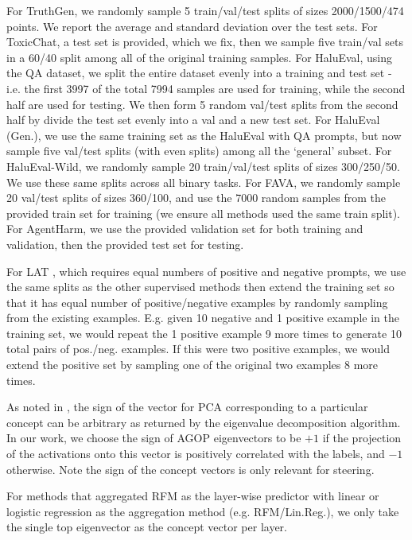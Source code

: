 For TruthGen, we randomly sample 5 train/val/test splits of sizes 2000/1500/474 points. We report the average and standard deviation over the test sets. For ToxicChat, a test set is provided, which we fix, then we sample five train/val sets in a 60/40 split among all of the original training samples. For HaluEval, using the QA dataset, we split the entire dataset evenly into a training and test set - i.e. the first 3997 of the total 7994 samples are used for training, while the second half are used for testing. We then form 5 random val/test splits from the second half by divide the test set evenly into a val and a new test set. For HaluEval (Gen.), we use the same training set as the HaluEval with QA prompts, but now sample five val/test splits (with even splits) among all the `general' subset. For HaluEval-Wild, we randomly sample 20 train/val/test splits of sizes 300/250/50. We use these same splits across all binary tasks. For FAVA, we randomly sample 20 val/test splits of sizes 360/100, and use the 7000 random samples from the provided train set for training (we ensure all methods used the same train split). For AgentHarm, we use the provided validation set for both training and validation, then the provided test set for testing. 

For LAT \citep{representation_engineering}, which requires equal numbers of positive and negative prompts, we use the same splits as the other supervised methods then extend the training set so that it has equal number of positive/negative examples by randomly sampling from the existing examples. E.g. given 10 negative and 1 positive example in the training set, we would repeat the 1 positive example 9 more times to generate 10 total pairs of pos./neg. examples. If this were two positive examples, we would extend the positive set by sampling one of the original two examples 8 more times.

As noted in \citet{representation_engineering}, the sign of the vector for PCA corresponding to a particular concept can be arbitrary as returned by the eigenvalue decomposition algorithm. In our work, we choose the sign of AGOP eigenvectors to be $+1$ if the projection of the activations onto this vector is positively correlated with the labels, and $-1$ otherwise. Note the sign of the concept vectors is only relevant for steering.

For methods that aggregated RFM as the layer-wise predictor with linear or logistic regression as the aggregation method (e.g. RFM/Lin.Reg.), we only take the single top eigenvector as the concept vector per layer.


